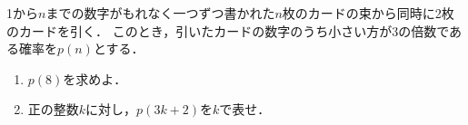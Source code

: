 \documentclass[../../main.tex]{subfiles}
\begin{document}
1から$n$までの数字がもれなく一つずつ書かれた$n$枚のカードの束から同時に2枚のカードを引く．
このとき，引いたカードの数字のうち小さい方が3の倍数である確率を$p(n)$とする．
\begin{enumerate}
  \item $p(8)$を求めよ．
  \item 正の整数$k$に対し，$p(3k+2)$を$k$で表せ．
\end{enumerate}
\end{document}
